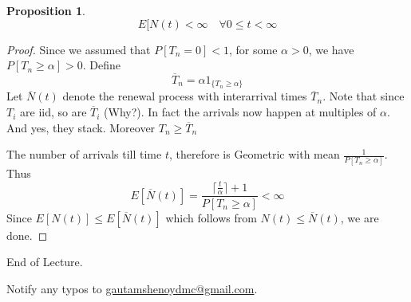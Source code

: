 \documentclass[a4paper,10pt]{article}
\newtheorem{Prop}{Proposition}
\begin{document}
\begin{Prop}
\[E[N(t) < \infty \quad \forall 0 \leq t < \infty\]
\end{Prop}
\begin{proof}
Since we assumed that $P[T_n=0] < 1$, for some $\alpha > 0$, we have $P[T_n \geq \alpha] >0$. Define
\[\overline{T}_n = \alpha 1_{\{T_n \geq \alpha\}}\]
Let $\overline{N}(t)$ denote the renewal process with interarrival times $\overline{T}_n$. Note that since $T_i$ are iid, so are $\overline{T}_i$ (Why?). In fact the arrivals now happen at multiples of $\alpha$. And yes, they stack. Moreover $T_n \geq \overline{T}_n$

The number of arrivals till time $t$, therefore is Geometric with mean $\frac{1}{P[T_n \geq \alpha]}$. Thus 
\[E[\overline{N}(t)] = \frac{\lceil\frac{t}{\alpha} \rceil + 1}{P[T_n \geq \alpha]} < \infty\]
Since $E[N(t)] \leq E[\overline{N}(t)]$ which follows from $N(t) \leq \overline{N}(t)$, we are done.
\end{proof}
End of Lecture.

Notify any typos to \url{gautamshenoydmc@gmail.com}.
\end{document}
